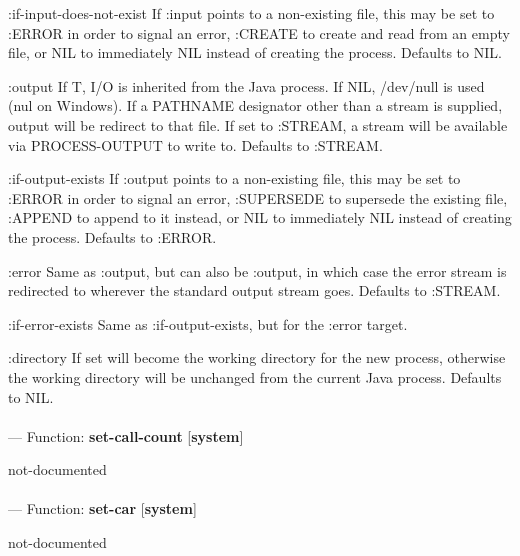 \begin{adjustwidth}{5em}{5em}
:if-input-does-not-exist
    If :input points to a non-existing file, this may be set to :ERROR in
    order to signal an error, :CREATE to create and read from an empty file,
    or NIL to immediately NIL instead of creating the process.
    Defaults to NIL.

:output
    If T, I/O is inherited from the Java process. If NIL, /dev/null is used
    (nul on Windows). If a PATHNAME designator other than a stream is
    supplied, output will be redirect to that file. If set to :STREAM, a
    stream will be available via PROCESS-OUTPUT to write to.
    Defaults to :STREAM.

:if-output-exists
    If :output points to a non-existing file, this may be set to :ERROR in
    order to signal an error, :SUPERSEDE to supersede the existing file,
    :APPEND to append to it instead, or NIL to immediately NIL instead of
    creating the process. Defaults to :ERROR.

:error
    Same as :output, but can also be :output, in which case the error stream
    is redirected to wherever the standard output stream goes.
    Defaults to :STREAM.

:if-error-exists
    Same as :if-output-exists, but for the :error target.

:directory
    If set will become the working directory for the new process, otherwise
    the working directory will be unchanged from the current Java process.
    Defaults to NIL.

\end{adjustwidth}

\paragraph{}
\label{SYSTEM:SET-CALL-COUNT}
--- Function: \textbf{set-call-count} [\textbf{system}] \textit{}

\begin{adjustwidth}{5em}{5em}
not-documented
\end{adjustwidth}

\paragraph{}
\label{SYSTEM:SET-CAR}
--- Function: \textbf{set-car} [\textbf{system}] \textit{}

\begin{adjustwidth}{5em}{5em}
not-documented
\end{adjustwidth}

